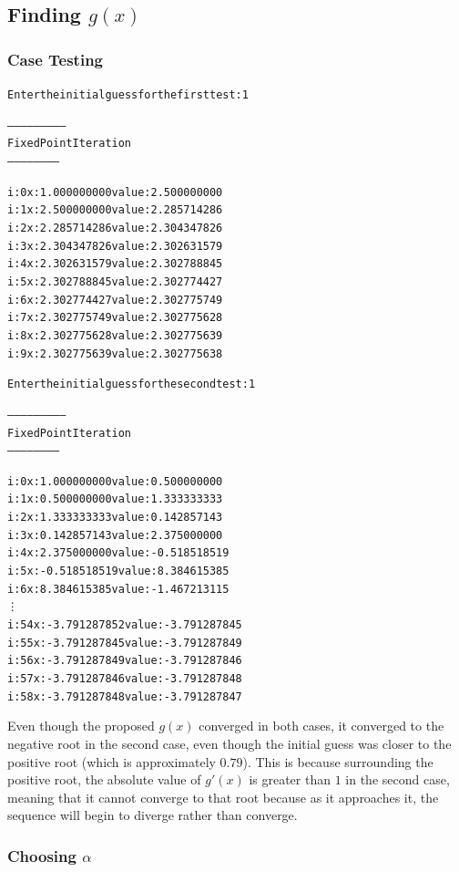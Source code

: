 \documentclass[11pt]{article} %
\begin{document}
\subsection*{Finding $g(x)$}

\subsubsection*{Case Testing}
\begin{alltt}
Enter the initial guess for the first test: 1 

--------------------------
 Fixed Point Iteration
 -----------------------


i: 0	x: 1.000000000	value: 2.500000000
i: 1	x: 2.500000000	value: 2.285714286
i: 2	x: 2.285714286	value: 2.304347826
i: 3	x: 2.304347826	value: 2.302631579
i: 4	x: 2.302631579	value: 2.302788845
i: 5	x: 2.302788845	value: 2.302774427
i: 6	x: 2.302774427	value: 2.302775749
i: 7	x: 2.302775749	value: 2.302775628
i: 8	x: 2.302775628	value: 2.302775639
i: 9	x: 2.302775639	value: 2.302775638

Enter the initial guess for the second test:  1

--------------------------
 Fixed Point Iteration
 -----------------------


i: 0	x: 1.000000000	value: 0.500000000
i: 1	x: 0.500000000	value: 1.333333333
i: 2	x: 1.333333333	value: 0.142857143
i: 3	x: 0.142857143	value: 2.375000000
i: 4	x: 2.375000000	value: -0.518518519
i: 5	x: -0.518518519	value: 8.384615385
i: 6	x: 8.384615385	value: -1.467213115
\vdots
i: 54	x: -3.791287852	value: -3.791287845
i: 55	x: -3.791287845	value: -3.791287849
i: 56	x: -3.791287849	value: -3.791287846
i: 57	x: -3.791287846	value: -3.791287848
i: 58	x: -3.791287848	value: -3.791287847
\end{alltt}
\par Even though the proposed $g(x)$ converged in both cases, it converged to the negative root in the second case, even though the initial guess
was closer to the positive root (which is approximately $0.79$). This is because surrounding the positive root, the absolute value of $g'(x)$ is greater than $1$ in the second case, meaning that it cannot converge to that root because as it approaches it, the sequence will begin to diverge rather than converge.

\subsubsection*{Choosing $\alpha$}
\end{document}
